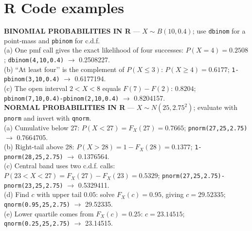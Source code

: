 \documentclass[landscape,0.4pt]{article}
\begin{document}
\begin{multicols*}{6}
\section*{\tiny{R Code examples}}
\vspace{-6pt}

\textbf{\tiny{BINOMIAL PROBABILITIES IN R}} — $X\sim B(10,0.4)$; use \texttt{dbinom} for a point‐mass and \texttt{pbinom} for c.d.f.\\
(a) One pmf call gives the exact likelihood of four successes: $P(X=4)=0.2508$;\;%
\texttt{dbinom(4,10,0.4)} $\rightarrow$ 0.2508227.\\
(b) “At least four’’ is the complement of $P(X\le3)$: $P(X\ge4)=0.6177$;\;%
\texttt{1-pbinom(3,10,0.4)} $\rightarrow$ 0.6177194.\\
(c) The open interval $2<X<8$ equals $F(7)-F(2)$: $0.8204$;\;%
\texttt{pbinom(7,10,0.4)-pbinom(2,10,0.4)} $\rightarrow$ 0.8204157.\\[-2pt]

\textbf{\tiny{NORMAL PROBABILITIES IN R}} — $X\sim N(25,2.75^{2})$; evaluate with \texttt{pnorm} and invert with \texttt{qnorm}.\\
(a) Cumulative below 27: $P(X<27)=F_X(27)=0.7665$;\;%
\texttt{pnorm(27,25,2.75)} $\rightarrow$ 0.7664705.\\
(b) Right-tail above 28: $P(X>28)=1-F_X(28)=0.1377$;\;%
\texttt{1-pnorm(28,25,2.75)} $\rightarrow$ 0.1376564.\\
(c) Central band uses two c.d.f. calls: $P(23<X<27)=F_X(27)-F_X(23)=0.5329$;\;%
\texttt{pnorm(27,25,2.75)-pnorm(23,25,2.75)} $\rightarrow$ 0.5329411.\\
(d) Find $c$ with upper tail $0.05$: solve $F_X(c)=0.95$, giving $c=29.52335$;\;%
\texttt{qnorm(0.95,25,2.75)} $\rightarrow$ 29.52335.\\
(e) Lower quartile comes from $F_X(c)=0.25$: $c=23.14515$;\;%
\texttt{qnorm(0.25,25,2.75)} $\rightarrow$ 23.14515.\\[-2pt]



\section*{\small{}}


\end{multicols*}
\end{document}
